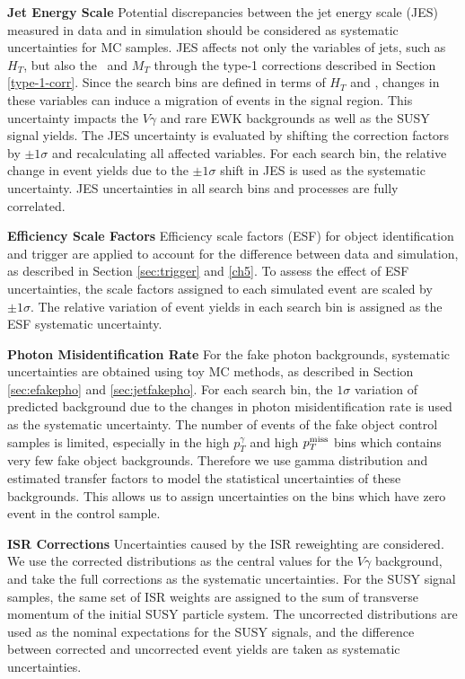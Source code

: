 \documentclass[thesis.tex]{subfiles}
\renewcommand\_{\textunderscore\allowbreak}
\begin{document}
\noindent \textbf{Jet Energy Scale} 
\quad Potential discrepancies between the jet energy scale (JES) measured in data and in simulation should be considered as systematic uncertainties for MC samples. 
JES affects not only the variables of jets, such as $H_T$, but also the \MET~and $M_T$ through the type-1 corrections described in Section \ref{type-1-corr}.
Since the search bins are defined in terms of $H_T$ and \MET, changes in these variables can induce a migration of events in the signal region. 
This uncertainty impacts the $V\gamma$ and rare EWK backgrounds as well as the SUSY signal yields. 
The JES uncertainty is evaluated by shifting the correction factors by $\pm 1 \sigma$ and recalculating all affected variables. 
For each search bin, the relative change in event yields due to the $\pm 1 \sigma$ shift in JES is used as the systematic uncertainty.
JES uncertainties in all search bins and processes are fully correlated. 

\noindent \textbf{Efficiency Scale Factors}
\quad Efficiency scale factors (ESF) for object identification and trigger are applied to account for the difference between data and simulation, as described in Section \ref{sec:trigger} and \ref{ch5}. 
To assess the effect of ESF uncertainties, the scale factors assigned to each simulated event are scaled by $\pm 1 \sigma$. 
The relative variation of event yields in each search bin is assigned as the ESF systematic uncertainty. 

\noindent \textbf{Photon Misidentification Rate} 
\quad For the fake photon backgrounds, systematic uncertainties are obtained using toy MC methods, as described in Section \ref{sec:efakepho} and \ref{sec:jetfakepho}. 
For each search bin, the $1 \sigma$ variation of predicted background due to the changes in photon misidentification rate is used as the systematic uncertainty. 
The number of events of the fake object control samples is limited, especially in the high $p_T^{\gamma}$ and high $p_T^\textrm{miss}$ bins which contains very few fake object backgrounds. 
Therefore we use gamma distribution and estimated transfer factors to model the statistical uncertainties of these backgrounds. This allows us to assign uncertainties on the bins which have zero event in the control sample. 

\noindent \textbf{ISR Corrections} 
\quad Uncertainties caused by the ISR reweighting are considered. 
We use the corrected distributions as the central values for the $V\gamma$ background, and take the full corrections as the systematic uncertainties.
For the SUSY signal samples, the same set of ISR weights are assigned to the sum of transverse momentum of the initial SUSY particle system. 
The uncorrected distributions are used as the nominal expectations for the SUSY signals, and the difference between corrected and uncorrected event yields are taken as systematic uncertainties. 
\end{document}
